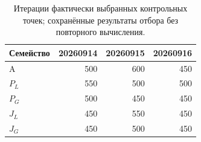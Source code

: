 \begin{table}[htbp]
\centering
\caption{Итерации фактически выбранных контрольных точек; сохранённые результаты отбора без повторного вычисления.}
\label{tab:main-selection}
\small
\begin{tabular}{lrrr}
\hline
Семейство & 20260914 & 20260915 & 20260916 \\
\hline
A & 500 & 600 & 450 \\
$P_{L}$ & 550 & 500 & 500 \\
$P_{G}$ & 500 & 450 & 450 \\
$J_{L}$ & 450 & 550 & 450 \\
$J_{G}$ & 450 & 500 & 450 \\
\hline
\end{tabular}
\end{table}
